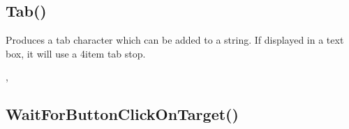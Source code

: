 \documentclass[letterpaper,10pt,english]{sphinxmanual}
\begin{document}
\sphinxAtStartPar
{}

\sphinxAtStartPar
{}

\ignorespaces 

\subsection{Tab()}
\label{\detokenize{reference/utility:tab}}\label{\detokenize{reference/utility:index-40}}
\sphinxAtStartPar
{}

\sphinxAtStartPar
Produces a tab character which can be added to a   string. If displayed in a text box, it will use a 4\sphinxhyphen{}item tab stop.

\sphinxAtStartPar
{}

\begin{sphinxVerbatim}[commandchars=\\\{\}]
\end{sphinxVerbatim}

\sphinxAtStartPar
{}

\begin{sphinxVerbatim}[commandchars=\\\{\}]
\end{sphinxVerbatim}

\sphinxAtStartPar
{}

\sphinxAtStartPar
{}, 

\ignorespaces 

\subsection{WaitForButtonClickOnTarget()}
\label{\detokenize{reference/utility:waitforbuttonclickontarget}}\label{\detokenize{reference/utility:index-41}}
\sphinxAtStartPar
{}
\end{document}
